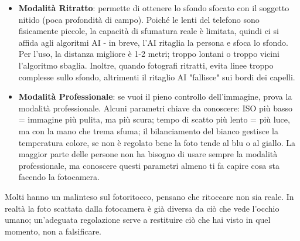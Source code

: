 \begin{itemize}
  \item \textbf{Modalità Ritratto}: permette di ottenere lo sfondo sfocato con il soggetto nitido (poca profondità di campo). Poiché le lenti del telefono sono fisicamente piccole, la capacità di sfumatura reale è limitata, quindi ci si affida agli algoritmi AI - in breve, l'AI ritaglia la persona e sfoca lo sfondo. Per l'uso, la distanza migliore è 1-2 metri; troppo lontani o troppo vicini l'algoritmo sbaglia. Inoltre, quando fotografi ritratti, evita linee troppo complesse sullo sfondo, altrimenti il ritaglio AI "fallisce" sui bordi dei capelli.
  \item \textbf{Modalità Professionale}: se vuoi il pieno controllo dell'immagine, prova la modalità professionale. Alcuni parametri chiave da conoscere: ISO più basso = immagine più pulita, ma più scura; tempo di scatto più lento = più luce, ma con la mano che trema sfuma; il bilanciamento del bianco gestisce la temperatura colore, se non è regolato bene la foto tende al blu o al giallo. La maggior parte delle persone non ha bisogno di usare sempre la modalità professionale, ma conoscere questi parametri almeno ti fa capire cosa sta facendo la fotocamera.
\end{itemize}


Molti hanno un malinteso sul fotoritocco, pensano che ritoccare non sia reale. In realtà la foto scattata dalla fotocamera è già diversa da ciò che vede l'occhio umano; un'adeguata regolazione serve a restituire ciò che hai visto in quel momento, non a falsificare.

